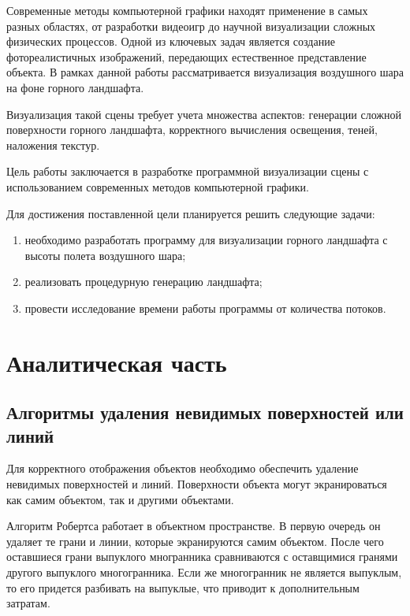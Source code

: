 



\setcounter{page}{3}
\makeatletter
\renewcommand{\l@section}{\@dottedtocline{1}{0em}{2em}} %
\renewcommand{\l@subsection}{\@dottedtocline{2}{1em}{2.5em}} %
\makeatother
\renewcommand{\contentsname}{\hfill СОДЕРЖАНИЕ \hfill}
\tableofcontents

Современные методы компьютерной графики находят применение в самых разных областях, от разработки видеоигр до научной визуализации сложных физических процессов. Одной из ключевых задач является создание фотореалистичных изображений, передающих естественное представление объекта. В рамках данной работы рассматривается визуализация воздушного шара на фоне горного ландшафта.

Визуализация такой сцены требует учета множества аспектов: генерации сложной поверхности горного ландшафта, корректного вычисления освещения, теней, наложения текстур.

Цель работы заключается в разработке программной визуализации сцены с использованием современных методов компьютерной графики.

Для достижения поставленной цели планируется решить следующие задачи:
\begin{enumerate}
\item необходимо разработать программу для визуализации горного ландшафта с высоты полета воздушного шара;
\item реализовать процедурную генерацию ландшафта;
\item провести исследование времени работы программы от количества потоков.
\end{enumerate}

\chapter{Аналитическая часть}
\section{Алгоритмы удаления невидимых поверхностей или линий}
Для корректного отображения объектов необходимо обеспечить удаление невидимых поверхностей и линий. Поверхности объекта могут экранироваться как самим объектом, так и другими объектами.

Алгоритм Робертса работает в объектном пространстве. В первую очередь он удаляет те грани и линии, которые экранируются самим объектом. После чего оставшиеся грани выпуклого многранника сравниваются с оставщимися гранями другого выпуклого многогранника. Если же многогранник не является выпуклым, то его придется разбивать на выпуклые, что приводит к дополнительным затратам. 


